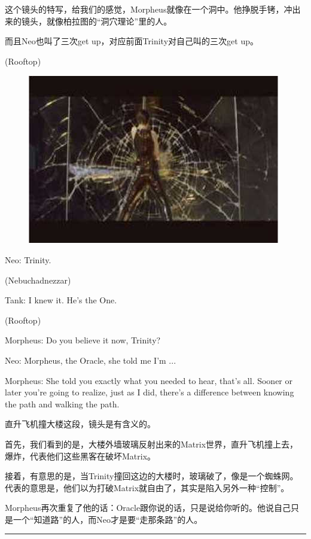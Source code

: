 \documentclass[UTF8]{ctexart}
\newcommand{\myparsep}{\noindent \rule[0.5ex]{\linewidth}{1pt}}
\newenvironment{myquote}{\color{green} \setlength{\leftskip}{6em} \setlength{\rightskip}{4em} \setlength{\parindent}{-2em}}{\par}
\begin{document}
这个镜头的特写，给我们的感觉，Morpheus就像在一个洞中。他挣脱手铐，冲出来的镜头，就像柏拉图的“洞穴理论”里的人。

而且Neo也叫了三次get up，对应前面Trinity对自己叫的三次get up。

\begin{myquote}
(Rooftop)

\begin{figure}[htb]
\centering
\includegraphics[width=0.5\linewidth]{fig/read_Matrix-70}
\end{figure}

Neo: Trinity.

(Nebuchadnezzar)

Tank: I knew it. He's the One.

(Rooftop)

Morpheus: Do you believe it now, Trinity?

Neo: Morpheus, the Oracle, she told me I'm ...

Morpheus: She told you exactly what you needed to hear, that's all. Sooner or later you're going to realize, just as I did, there's a difference between knowing the path and walking the path.
\end{myquote}

直升飞机撞大楼这段，镜头是有含义的。

首先，我们看到的是，大楼外墙玻璃反射出来的Matrix世界，直升飞机撞上去，爆炸，代表他们这些黑客在破坏Matrix。

接着，有意思的是，当Trinity撞回这边的大楼时，玻璃破了，像是一个蜘蛛网。代表的意思是，他们以为打破Matrix就自由了，其实是陷入另外一种“控制”。

Morpheus再次重复了他的话：Oracle跟你说的话，只是说给你听的。他说自己只是一个“知道路”的人，而Neo才是要“走那条路”的人。

\myparsep
\end{document}
